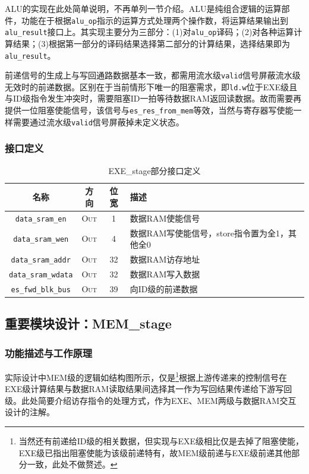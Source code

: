 \documentclass[UTF-8,twoside,c5size]{ctexart}
\begin{document}
	ALU的实现在此处简单说明，不再单列一节介绍。ALU是纯组合逻辑的运算部件，功能在于根据\texttt{alu\_op}指示的运算方式处理两个操作数，将运算结果输出到\texttt{alu\_result}接口上。其实现主要分为三部分：(1)对\texttt{alu\_op}译码；(2)对各种运算计算结果；(3)根据第一部分的译码结果选择第二部分的计算结果，选择结果即为\texttt{alu\_result}。
	
	前递信号的生成上与写回通路数据基本一致，都需用流水级\texttt{valid}信号屏蔽流水级无效时的前递数据。区别在于当前情形下唯一的阻塞需求，即\texttt{ld.w}位于EXE级且与ID级指令发生冲突时，需要阻塞ID一拍等待数据RAM返回读数据。故而需要再提供一位阻塞使能信号，该信号与\texttt{es\_res\_from\_mem}等效，当然与寄存器写使能一样需要通过流水级\texttt{valid}信号屏蔽掉未定义状态。
	
	\subsubsection{接口定义}
	\begin{table}[!h]
		\centering
		\caption{EXE\_stage部分接口定义}
		\begin{tabularx}{\textwidth}{|c|c|c|Y|}
			\hline
			\textbf{名称} & \textbf{方向} & \textbf{位宽} & \textbf{描述} \\
			\hline
			\texttt{data\_sram\_en} & \textsc{Out} & 1 & 数据RAM使能信号 \\
			\hline
			\texttt{data\_sram\_wen} & \textsc{Out} & 4 & 数据RAM写使能信号，store指令置为全1，其他全0 \\
			\hline
			\texttt{data\_sram\_addr} & \textsc{Out} & 32 & 数据RAM访存地址 \\
			\hline
			\texttt{data\_sram\_wdata} & \textsc{Out} & 32 & 数据RAM写入数据 \\
			\hline
			\texttt{es\_fwd\_blk\_bus} & \textsc{Out} & 39 & 向ID级的前递数据 \\
			\hline
		\end{tabularx}
	\end{table}

	\subsection{重要模块设计：MEM\_stage}
	\subsubsection{功能描述与工作原理}
	实际设计中MEM级的逻辑如结构图所示，仅是\footnote{当然还有前递给ID级的相关数据，但实现与EXE级相比仅是去掉了阻塞使能，EXE级已指出阻塞使能为该级前递特有，故MEM级前递与EXE级前递其他部分一致，此处不做赘述。}根据上游传递来的控制信号在EXE级计算结果与数据RAM读取结果间选择其一作为写回结果传递给下游写回级。此处简要介绍访存指令的处理方式，作为EXE、MEM两级与数据RAM交互设计的注解。
	
\end{document}
